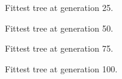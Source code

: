 \documentclass[12pt]{article}
\begin{document}
\begin{figure}[H]
    \centering
    \caption{Fittest tree at generation 25.}
\end{figure}

\begin{figure}[H]
    \centering
    \caption{Fittest tree at generation 50.}
\end{figure}

\begin{figure}[H]
    \centering
    \caption{Fittest tree at generation 75.}
\end{figure}

\begin{figure}[H]
    \centering
    \caption{Fittest tree at generation 100.}
\end{figure}
\end{document}
